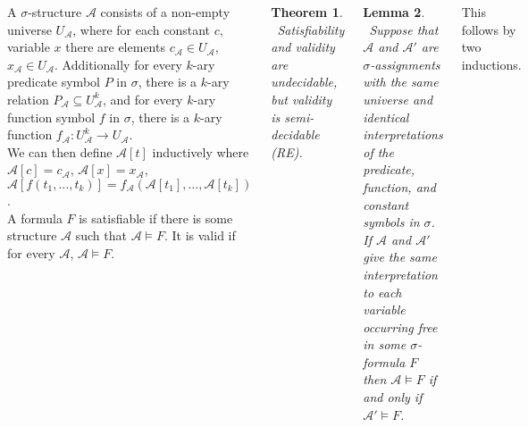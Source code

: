\documentclass{tikzposter} %
\newtheorem{theorem}{Theorem}
\newtheorem{lemma}[theorem]{Lemma}
\begin{document}
\begin{columns}
{    A $\sigma$-structure $\mathcal{A}$ consists of a non-empty universe $U_{\mathcal{A}}$, where for each constant $c$, variable $x$ there are elements $c_{\mathcal{A}} \in U_{\mathcal{A}}$, $x_{\mathcal{A}} \in U_{\mathcal{A}}$. Additionally for every $k$-ary predicate symbol $P$ in $\sigma$, there is a $k$-ary relation $P_{\mathcal{A}} \subseteq U_{\mathcal{A}}^{k}$, and for every $k$-ary function symbol $f$ in $\sigma$, there is a $k$-ary function $f_{\mathcal{A}} : U_{\mathcal{A}}^{k} \to U_{\mathcal{A}}$. \\

    We can then define $\mathcal{A}[t]$ inductively where $\mathcal{A}[c] = c_{\mathcal{A}}$, $\mathcal{A}[x] = x_{\mathcal{A}}$, $\mathcal{A}[f(t_{1}, \dots, t_{k})] = f_{\mathcal{A}}(\mathcal{A}[t_{1}], \dots, \mathcal{A}[t_{k}])$. \\

    A formula $F$ is satisfiable if there is some structure $\mathcal{A}$ such that $\mathcal{A} \vDash F$. It is valid if for every $\mathcal{A}$, $\mathcal{A} \vDash F$. \\

    \begin{theorem}
    \ Satisfiability and validity are undecidable, but validity is semi-decidable (RE).
    \end{theorem}
    \hphantom{}

    \begin{lemma}
    \ Suppose that $\mathcal{A}$ and $\mathcal{A}'$ are $\sigma$-assignments with the same universe and identical interpretations of the predicate, function, and constant symbols in $\sigma$. If $\mathcal{A}$ and $\mathcal{A}'$ give the same interpretation to each variable occurring free in some $\sigma$-formula $F$ then $\mathcal{A} \vDash F$ if and only if $\mathcal{A}' \vDash F$.
    \end{lemma}
    \hphantom{}

    This follows by two inductions.
    }

\end{columns}
\end{document}
